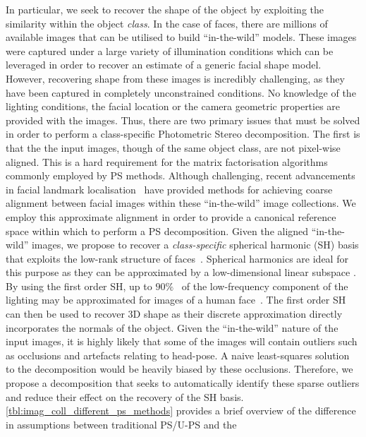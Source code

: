 In particular, we seek to recover the shape of the object by exploiting the
similarity within the object \textit{class}. 
In the case of faces, there are millions of
available images that can be utilised to build ``in-the-wild'' models. These images
were captured under a large variety of illumination conditions which can be
leveraged in order to recover an estimate of a generic facial shape model.
However, recovering shape from these images is incredibly challenging, as they have been
captured in completely unconstrained conditions. No knowledge of the lighting
conditions, the facial location or the camera geometric properties are provided
with the images. Thus, there are two primary issues that must be solved in
order to perform a class-specific Photometric Stereo decomposition. The first
is that the the input images, though of the same object class, are not
pixel-wise aligned. This is a hard requirement for the matrix factorisation
algorithms commonly employed by PS methods. Although challenging, recent
advancements in facial landmark localisation~\cite{cootes2001active} have
provided methods for achieving coarse alignment between facial images within
these ``in-the-wild'' image collections. We employ this approximate alignment
in order to provide a canonical reference space within which to perform
a PS decomposition. Given the aligned ``in-the-wild'' images, we propose to
recover a \textit{class-specific} spherical harmonic (SH)
basis that exploits the low-rank structure of
faces~\cite{georghiades2001fromfew,Basri:2003ie}. Spherical harmonics are ideal for
this purpose as they can be approximated by a low-dimensional linear subspace
\cite{Basri:2003ie,ramamoorthi2001relationship}.
By using the first order SH, up to $90\%$~\cite{yuille1999determining} of
the low-frequency component of the lighting may be approximated for images
of a human face~\cite{Basri:2003ie,%
basri2007photometric,yuille1999determining}. The first order SH
can then be used to recover 3D shape as their discrete approximation directly
incorporates the normals of the object. Given the ``in-the-wild'' nature of
the input images, it is highly likely that some of the images will contain
outliers such as occlusions and artefacts relating to head-pose. A naive
least-squares solution to the decomposition would be heavily biased
by these occlusions. Therefore, we propose a decomposition that seeks to
automatically identify these sparse outliers and reduce their effect on
the recovery of the SH basis.
\cref{tbl:imag_coll_different_ps_methods} provides a brief
overview of the difference in assumptions between traditional PS/U-PS and the
